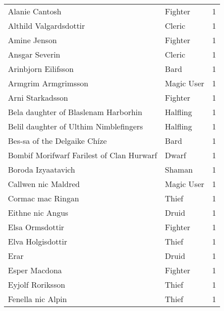 \begin{tcolorbox}[breakable, title=Index by level]
\begin{supertabular}{p{0.6\columnwidth}lr}
Alanie Cantosh                                     & Fighter         &     1\\
Althild Valgardsdottir                             & Cleric          &     1\\
Amine Jenson                                       & Fighter         &     1\\
Ansgar Severin                                     & Cleric          &     1\\
Arinbjorn Eilifsson                                & Bard            &     1\\
Armgrim Armgrimsson                                & Magic User      &     1\\
Arni Starkadsson                                   & Fighter         &     1\\
Bela daughter of Blaslenam Harborhin               & Halfling        &     1\\
Belil daughter of Ulthim Nimblefingers             & Halfling        &     1\\
Bes-sa of the Delgaike Ch\'ize                     & Bard            &     1\\
Bombif Morifwarf Farilest of Clan Hurwarf          & Dwarf           &     1\\
Boroda Izyaatavich                                 & Shaman          &     1\\
Callwen nic Maldred                                & Magic User      &     1\\
Cormac mac Ringan                                  & Thief           &     1\\
Eithne nic Angus                                   & Druid           &     1\\
Elsa Ormsdottir                                    & Fighter         &     1\\
Elva Holgisdottir                                  & Thief           &     1\\
Erar                                               & Druid           &     1\\
Esper Macdona                                      & Fighter         &     1\\
Eyjolf Roriksson                                   & Thief           &     1\\
Fenella nic Alpin                                  & Thief           &     1\\

\end{supertabular}
\end{tcolorbox}
